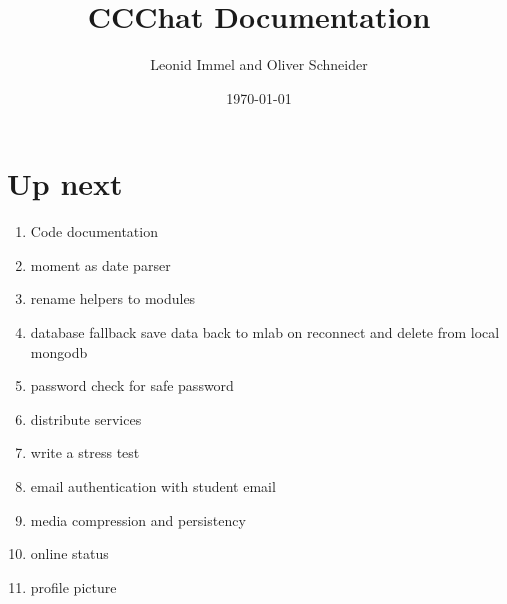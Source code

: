 \documentclass[10pt,a4paper,landscape]{article}
\title{CCChat Documentation}
\date{\today}
\author{Leonid Immel and Oliver Schneider}
\begin{document}
\maketitle
\tableofcontents
\newpage
\section{Up next}
\begin{enumerate}
        \item
                Code documentation
        \item
                moment as date parser 
        \item
                rename helpers to modules
        \item
                database fallback save data back to mlab on reconnect and delete from local mongodb
        \item
                password check for safe password
        \item
                distribute services
        \item
                write a stress test
        \item 
                email authentication with student email
        \item
                media compression and persistency
        \item
                online status
        \item 
                profile picture
\end{enumerate}
\end{document}
